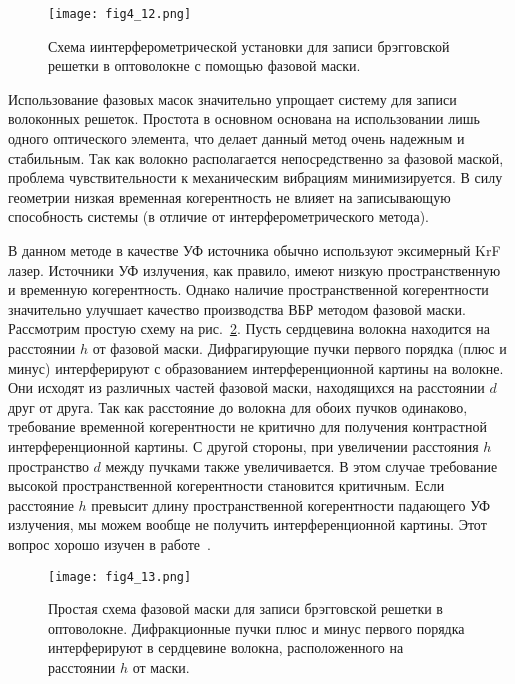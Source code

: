 \begin{figure}
\centering
\texttt{[image: fig4\_12.png]}
\caption{Схема иинтерферометрической установки для записи брэгговской решетки в оптоволокне с помощью фазовой маски.}\label{fig4.12}
\end{figure}

Использование фазовых масок значительно упрощает систему для записи волоконных решеток. Простота в основном основана на использовании лишь одного оптического элемента, что делает данный метод очень надежным и стабильным. Так как волокно располагается непосредственно за фазовой маской, проблема чувствительности к механическим вибрациям минимизируется. В силу геометрии низкая временная когерентность не влияет на записывающую способность системы (в отличие от интерферометрического метода).

В данном методе в качестве УФ источника обычно используют эксимерный KrF лазер. Источники УФ излучения, как правило, имеют низкую пространственную и временную когерентность. Однако наличие пространственной когерентности значительно улучшает качество производства ВБР методом фазовой маски. Рассмотрим простую схему на рис.~\ref{fig4.13}. Пусть сердцевина волокна находится на расстоянии $h$ от фазовой маски. Дифрагирующие пучки первого порядка (плюс и минус) интерферируют с образованием интерференционной картины на волокне. Они исходят из различных частей фазовой маски, находящихся на расстоянии $d$ друг от друга. Так как расстояние до волокна для обоих пучков одинаково, требование временной когерентности не критично для получения контрастной интерференционной картины. С другой стороны, при увеличении расстояния $h$ пространство $d$ между пучками также увеличивается. В этом случае требование высокой пространственной когерентности становится критичным. Если расстояние $h$ превысит длину пространственной когерентности падающего УФ излучения, мы можем вообще не получить интерференционной картины. Этот вопрос хорошо изучен в работе~\cite{Dyer96}.

\begin{figure}
\centering
\texttt{[image: fig4\_13.png]}
\caption{Простая схема фазовой маски для записи брэгговской решетки в оптоволокне. Дифракционные пучки плюс и минус первого порядка интерферируют в сердцевине волокна, расположенного на расстоянии $h$ от маски.}\label{fig4.13}
\end{figure}


